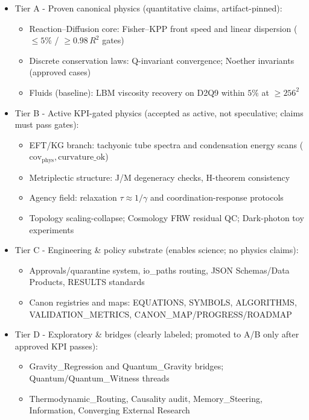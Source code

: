 \documentclass[
]{article}
\providecommand{\tightlist}{%
  \setlength{\itemsep}{0pt}\setlength{\parskip}{0pt}}
\begin{document}
\begin{itemize}
\tightlist
\item
  Tier A - Proven canonical physics (quantitative claims,
  artifact-pinned):

  \begin{itemize}
  \tightlist
  \item
    Reaction--Diffusion core: Fisher--KPP front speed and linear
    dispersion (\(\le 5\%\) / \(\ge 0.98\,R^{2}\) gates)
  \item
    Discrete conservation laws: Q-invariant convergence; Noether
    invariants (approved cases)
  \item
    Fluids (baseline): LBM viscosity recovery on D2Q9 within \(5\%\) at
    \(\ge 256^{2}\)
  \end{itemize}
\item
  Tier B - Active KPI-gated physics (accepted as active, not
  speculative; claims must pass gates):

  \begin{itemize}
  \tightlist
  \item
    EFT/KG branch: tachyonic tube spectra and condensation energy scans
    (\(\mathrm{cov}_{\mathrm{phys}}, \mathrm{curvature\_ok}\))
  \item
    Metriplectic structure: J/M degeneracy checks, H-theorem consistency
  \item
    Agency field: relaxation \(\tau\approx 1/\gamma\) and
    coordination-response protocols
  \item
    Topology scaling-collapse; Cosmology FRW residual QC; Dark-photon
    toy experiments
  \end{itemize}
\item
  Tier C - Engineering \& policy substrate (enables science; no physics
  claims):

  \begin{itemize}
  \tightlist
  \item
    Approvals/quarantine system, io\_paths routing, JSON Schemas/Data
    Products, RESULTS standards
  \item
    Canon registries and maps: EQUATIONS, SYMBOLS, ALGORITHMS,
    VALIDATION\_METRICS, CANON\_MAP/PROGRESS/ROADMAP
  \end{itemize}
\item
  Tier D - Exploratory \& bridges (clearly labeled; promoted to A/B only
  after approved KPI passes):

  \begin{itemize}
  \tightlist
  \item
    Gravity\_Regression and Quantum\_Gravity bridges;
    Quantum/Quantum\_Witness threads
  \item
    Thermodynamic\_Routing, Causality audit, Memory\_Steering,
    Information, Converging External Research
  \end{itemize}
\end{itemize}
\end{document}
